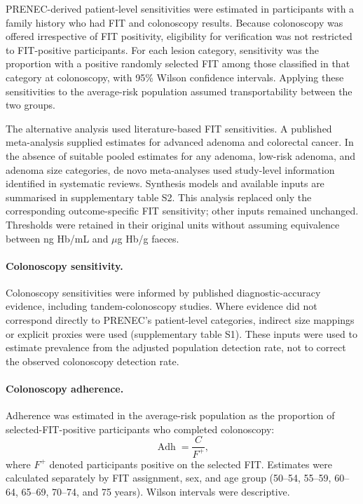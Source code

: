 \documentclass[10pt,a4paper]{article}
\newcommand{\Adh}{\operatorname{Adh}}
\begin{document}
PRENEC-derived patient-level sensitivities were estimated in participants with a family history who had FIT and colonoscopy results. Because colonoscopy was offered irrespective of FIT positivity, eligibility for verification was not restricted to FIT-positive participants. For each lesion category, sensitivity was the proportion with a positive randomly selected FIT among those classified in that category at colonoscopy, with 95\% Wilson confidence intervals. Applying these sensitivities to the average-risk population assumed transportability between the two groups.

The alternative analysis used literature-based FIT sensitivities. A published meta-analysis supplied estimates for advanced adenoma and colorectal cancer\cite{Lin2021}. In the absence of suitable pooled estimates for any adenoma, low-risk adenoma, and adenoma size categories, de novo meta-analyses used study-level information identified in systematic reviews. Synthesis models and available inputs are summarised in supplementary table S2. This analysis replaced only the corresponding outcome-specific FIT sensitivity; other inputs remained unchanged. Thresholds were retained in their original units without assuming equivalence between ng Hb/mL and $\mu$g Hb/g faeces.



\paragraph{Colonoscopy sensitivity.}
Colonoscopy sensitivities were informed by published diagnostic-accuracy evidence, including tandem-colonoscopy studies\cite{Martin2013,vanRijn2006,Zhao2023}. Where evidence did not correspond directly to PRENEC's patient-level categories, indirect size mappings or explicit proxies were used (supplementary table S1). These inputs were used to estimate prevalence from the adjusted population detection rate, not to correct the observed colonoscopy detection rate.

\paragraph{Colonoscopy adherence.}
Adherence was estimated in the average-risk population as the proportion of selected-FIT-positive participants who completed colonoscopy:
\begin{equation*}
\Adh=\frac{C}{F^+},
\end{equation*}
where $F^+$ denoted participants positive on the selected FIT. Estimates were
calculated separately by FIT assignment, sex, and age group (50--54, 55--59,
60--64, 65--69, 70--74, and 75 years). Wilson intervals were descriptive.
\end{document}
